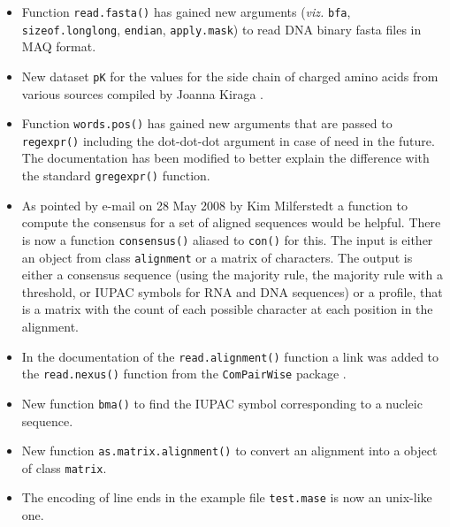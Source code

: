 \documentclass{article}
\begin{document}
\begin{itemize}

\item Function \texttt{read.fasta()} has gained new arguments
  (\textit{viz.} \texttt{bfa}, \texttt{sizeof.longlong},
  \texttt{endian}, \texttt{apply.mask}) to read DNA binary fasta
  files in MAQ format.

\item New dataset \texttt{pK} for the values for the side chain of 
  charged amino acids from various sources compiled by Joanna Kiraga
  \cite{KiragaJ2008}.

\item Function \texttt{words.pos()} has gained new arguments that
  are passed to \texttt{regexpr()} including the dot-dot-dot
  argument in case of need in the future. The documentation has
  been modified to better explain the difference with the standard
  \texttt{gregexpr()} function.

\item As pointed by e-mail on 28 May 2008 by Kim Milferstedt a
  function to compute the consensus for a set of aligned sequences
  would be helpful. There is now a function \texttt{consensus()}
  aliased to \texttt{con()} for this. The input is either an object
  from class \texttt{alignment} or a matrix of characters. The
  output is either a consensus sequence (using the majority rule,
  the majority rule with a threshold, or IUPAC symbols for RNA
  and DNA sequences) or a profile, that is a matrix with the count 
  of each possible character at each position in the alignment.

\item In the documentation of the \texttt{read.alignment()} function
  a link was added to the \texttt{read.nexus()} function from the
  \texttt{ComPairWise} package \cite{ComPairWise}.

\item New function \texttt{bma()} to find the IUPAC symbol corresponding
  to a nucleic sequence.

\item New function \texttt{as.matrix.alignment()} to convert an
  alignment into a object of class \texttt{matrix}.

\item The encoding of line ends in the example file \texttt{test.mase}
  is now an unix-like one.


\end{itemize}
\end{document}
